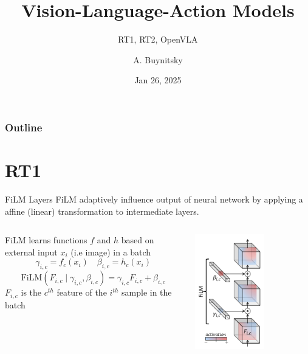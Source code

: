 \documentclass{beamer}
\title[RT1, RT2, OpenVLA]{Vision-Language-Action Models}
\subtitle{RT1, RT2, OpenVLA} %
\author[MLP]{A. Buynitsky}
\date{Jan 26, 2025}
\begin{document}
\frame{\titlepage}


\begin{frame}
\frametitle{Outline}
\tableofcontents
\end{frame}
\section{RT1}

\begin{frame}[t]{FiLM Layers}
    FiLM adaptively influence output of neural network by applying a affine (linear) transformation to intermediate layers. \newline
    \begin{columns}
        \hspace{1em}
		\begin{column}{.5\textwidth}
            FiLM learns functions $f$ and $h$  based on external input $x_i$ (i.e image) in a batch
            \small
                \[\gamma_{i,c} = f_c(x_i) \quad \beta_{i,c} = h_c(x_i)\]
                \[\text{FiLM}(F_{i,c} \mid \gamma_{i,c}, \beta_{i,c}) = \gamma_{i,c} F_{i,c} + \beta_{i,c}\]
            \normalsize
            $F_{i,c}$ is the $c^{th}$ feature of the $i^{th}$ sample in the batch
		\end{column}
        \hspace{0em}
		\begin{column}{.5\textwidth}
            \begin{center}
                \includegraphics[width=0.6\textwidth]{./img/film_comp.png}
            \end{center}
		\end{column}
	\end{columns}
\end{frame}
\end{document}

